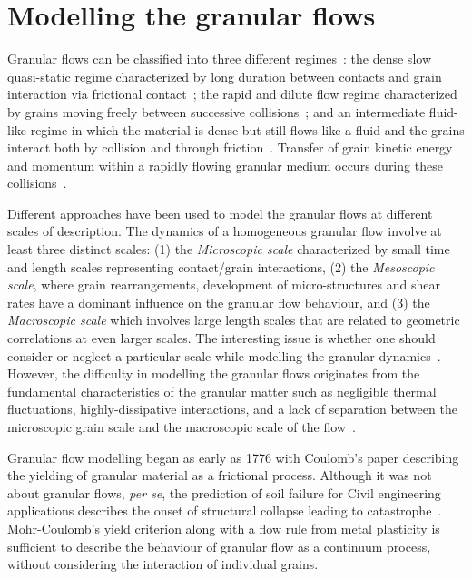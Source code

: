 \section{Modelling the granular flows}
Granular flows can be classified into three different 
regimes~\citep{Jaeger1996}: the dense slow quasi-static regime characterized by 
long duration between contacts and grain interaction via frictional 
contact~\citep{Roux2002}; the rapid and dilute flow regime characterized by 
grains moving freely between successive 
collisions~\citep{Goldhirsch2003}; and an intermediate fluid-like regime in 
which the material is dense but still flows like a fluid and the grains 
interact both by collision and through friction~\citep{Midi2004,Pouliquen2002}. 
Transfer of grain kinetic energy and momentum within a rapidly flowing 
granular medium occurs during these collisions~\citep{Popken1999}. 

Different approaches have been used to model the granular flows at different 
scales of description. The dynamics of a homogeneous granular flow involve at 
least three distinct scales: (1) the \textit{Microscopic scale} characterized 
by small time and length scales representing contact/grain interactions, (2) 
the \textit{Mesoscopic scale}, where grain rearrangements, development of 
micro-structures and shear rates have a dominant influence on the granular flow 
behaviour, and (3) the \textit{Macroscopic scale} which involves large length 
scales that are related to geometric correlations at even larger scales. The 
interesting issue is whether one should consider or neglect a particular scale 
while modelling the granular dynamics~\citep{Radjai2009}. However, the 
difficulty in modelling the granular flows originates from the fundamental 
characteristics of the granular matter such as negligible thermal fluctuations, 
highly-dissipative interactions, and a lack of separation between the 
microscopic grain scale and the macroscopic scale of the 
flow~\citep{Goldhirsch2003}. 

Granular flow modelling began as early as 1776 with Coulomb's paper describing 
the yielding of granular material as a frictional process. 
Although it was not about granular flows, \textit{per se}, the prediction of 
soil failure for Civil engineering applications describes the onset of 
structural collapse leading to catastrophe~\citep{Campbell2006}. Mohr-Coulomb's 
yield criterion along with a flow rule from metal plasticity is sufficient to 
describe the behaviour of granular flow as a continuum process, without 
considering the interaction of individual grains.

